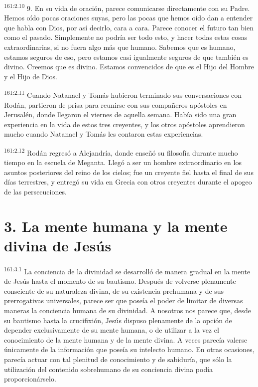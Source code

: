 \par 
\textsuperscript{161:2.10} 9. En su vida de oración, parece comunicarse directamente con su Padre. Hemos oído pocas oraciones suyas, pero las pocas que hemos oído dan a entender que habla con Dios, por así decirlo, cara a cara. Parece conocer el futuro tan bien como el pasado. Simplemente no podría ser todo esto, y hacer todas estas cosas extraordinarias, si no fuera algo más que humano. Sabemos que es humano, estamos seguros de eso, pero estamos casi igualmente seguros de que también es divino. Creemos que es divino. Estamos convencidos de que es el Hijo del Hombre y el Hijo de Dios.

\par 
\textsuperscript{161:2.11} Cuando Natanael y Tomás hubieron terminado sus conversaciones con Rodán, partieron de prisa para reunirse con sus compañeros apóstoles en Jerusalén, donde llegaron el viernes de aquella semana. Había sido una gran experiencia en la vida de estos tres creyentes, y los otros apóstoles aprendieron mucho cuando Natanael y Tomás les contaron estas experiencias.

\par 
\textsuperscript{161:2.12} Rodán regresó a Alejandría, donde enseñó su filosofía durante mucho tiempo en la escuela de Meganta. Llegó a ser un hombre extraordinario en los asuntos posteriores del reino de los cielos; fue un creyente fiel hasta el final de sus días terrestres, y entregó su vida en Grecia con otros creyentes durante el apogeo de las persecuciones.

\section*{3. La mente humana y la mente divina de Jesús}
\par 
\textsuperscript{161:3.1} La conciencia de la divinidad se desarrolló de manera gradual en la mente de Jesús hasta el momento de su bautismo. Después de volverse plenamente consciente de su naturaleza divina, de su existencia prehumana y de sus prerrogativas universales, parece ser que poseía el poder de limitar de diversas maneras la conciencia humana de su divinidad. A nosotros nos parece que, desde su bautismo hasta la crucifixión, Jesús dispuso plenamente de la opción de depender exclusivamente de su mente humana, o de utilizar a la vez el conocimiento de la mente humana y de la mente divina. A veces parecía valerse únicamente de la información que poseía su intelecto humano. En otras ocasiones, parecía actuar con tal plenitud de conocimiento y de sabiduría, que sólo la utilización del contenido sobrehumano de su conciencia divina podía proporcionárselo.

